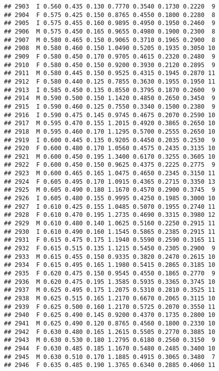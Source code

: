 \documentclass[
]{article}
\begin{document}
\begin{verbatim}
## 2903  I 0.560 0.435 0.130 0.7770 0.3540 0.1730 0.2220  9
## 2904  F 0.575 0.425 0.150 0.8765 0.4550 0.1800 0.2280  8
## 2905  I 0.575 0.455 0.160 0.9895 0.4950 0.1950 0.2460  9
## 2906  M 0.575 0.450 0.165 0.9655 0.4980 0.1900 0.2300  8
## 2907  M 0.580 0.465 0.150 0.9065 0.3710 0.1965 0.2900  8
## 2908  M 0.580 0.460 0.150 1.0490 0.5205 0.1935 0.3050 10
## 2909  F 0.580 0.450 0.170 0.9705 0.4615 0.2320 0.2480  9
## 2910  F 0.580 0.450 0.150 0.9200 0.3930 0.2120 0.2895  9
## 2911  M 0.580 0.445 0.150 0.9525 0.4315 0.1945 0.2870 11
## 2912  F 0.580 0.440 0.125 0.7855 0.3630 0.1955 0.1950 11
## 2913  I 0.585 0.450 0.135 0.8550 0.3795 0.1870 0.2600  9
## 2914  M 0.590 0.500 0.150 1.1420 0.4850 0.2650 0.3450  9
## 2915  I 0.590 0.460 0.125 0.7550 0.3340 0.1500 0.2380  9
## 2916  I 0.590 0.475 0.145 0.9745 0.4675 0.2070 0.2590 10
## 2917  M 0.595 0.470 0.155 1.2015 0.4920 0.3865 0.2650 10
## 2918  M 0.595 0.460 0.170 1.1295 0.5700 0.2555 0.2650 10
## 2919  I 0.600 0.445 0.135 0.9205 0.4450 0.2035 0.2530  9
## 2920  F 0.600 0.480 0.170 1.0560 0.4575 0.2435 0.3135 10
## 2921  M 0.600 0.450 0.195 1.3400 0.6170 0.3255 0.3605 10
## 2922  F 0.600 0.450 0.150 0.9625 0.4375 0.2225 0.2775  9
## 2923  M 0.600 0.465 0.165 1.0475 0.4650 0.2345 0.3150 11
## 2924  F 0.605 0.495 0.170 1.0915 0.4365 0.2715 0.3350 13
## 2925  M 0.605 0.490 0.180 1.1670 0.4570 0.2900 0.3745  9
## 2926  I 0.605 0.480 0.155 0.9995 0.4250 0.1985 0.3000 10
## 2927  I 0.610 0.425 0.155 1.0485 0.5070 0.1955 0.2740 11
## 2928  F 0.610 0.470 0.195 1.2735 0.4690 0.3315 0.3980 12
## 2929  M 0.610 0.480 0.140 1.0625 0.5160 0.2250 0.2915 11
## 2930  I 0.610 0.490 0.160 1.1545 0.5865 0.2385 0.2915 11
## 2931  F 0.615 0.475 0.175 1.1940 0.5590 0.2590 0.3165 11
## 2932  F 0.615 0.515 0.135 1.1215 0.5450 0.2305 0.2900  9
## 2933  M 0.615 0.455 0.150 0.9335 0.3820 0.2470 0.2615 10
## 2934  F 0.615 0.495 0.165 1.1980 0.5415 0.2865 0.3185 10
## 2935  F 0.620 0.475 0.150 0.9545 0.4550 0.1865 0.2770  9
## 2936  M 0.620 0.475 0.195 1.3585 0.5935 0.3365 0.3745 10
## 2937  M 0.625 0.495 0.175 1.2075 0.5310 0.2810 0.3525 11
## 2938  M 0.625 0.515 0.165 1.2170 0.6670 0.2065 0.3115 10
## 2939  F 0.625 0.500 0.160 1.2170 0.5725 0.2070 0.3550 11
## 2940  F 0.625 0.490 0.145 0.9200 0.4370 0.1735 0.2800 10
## 2941  M 0.625 0.490 0.120 0.8765 0.4560 0.1800 0.2330 10
## 2942  F 0.630 0.480 0.165 1.2615 0.5505 0.2770 0.3885 10
## 2943  M 0.630 0.530 0.180 1.2795 0.6180 0.2560 0.3150  9
## 2944  F 0.630 0.485 0.185 1.1670 0.5480 0.2485 0.3400 10
## 2945  M 0.630 0.510 0.170 1.1885 0.4915 0.3065 0.3480  7
## 2946  F 0.635 0.485 0.190 1.3765 0.6340 0.2885 0.4060 11

\end{verbatim}
\end{document}
